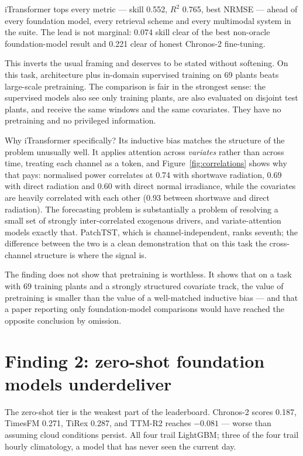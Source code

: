 iTransformer tops every metric --- skill 0.552, $R^2$ 0.765, best NRMSE --- ahead of every
foundation model, every retrieval scheme and every multimodal system in the suite. The lead
is not marginal: 0.074 skill clear of the best non-oracle foundation-model result and 0.221
clear of honest Chronos-2 fine-tuning.

This inverts the usual framing and deserves to be stated without softening. On this task,
architecture plus in-domain supervised training on 69 plants beats large-scale pretraining.
The comparison is fair in the strongest sense: the supervised models also see only training
plants, are also evaluated on disjoint test plants, and receive the same windows and the same
covariates. They have no pretraining and no privileged information.

Why iTransformer specifically? Its inductive bias matches the structure of the problem
unusually well. It applies attention across \emph{variates} rather than across time, treating
each channel as a token, and Figure~\ref{fig:correlations} shows why that pays: normalised
power correlates at 0.74 with shortwave radiation, 0.69 with direct radiation and 0.60 with
direct normal irradiance, while the covariates are heavily correlated with each other
(0.93 between shortwave and direct radiation). The forecasting problem is substantially a
problem of resolving a small set of strongly inter-correlated exogenous drivers, and
variate-attention models exactly that. PatchTST, which is channel-independent, ranks seventh;
the difference between the two is a clean demonstration that on this task the cross-channel
structure is where the signal is.

The finding does not show that pretraining is worthless. It shows that on a task with 69
training plants and a strongly structured covariate track, the value of pretraining is
smaller than the value of a well-matched inductive bias --- and that a paper reporting only
foundation-model comparisons would have reached the opposite conclusion by omission.

\section{Finding 2: zero-shot foundation models underdeliver}
\label{sec:finding2}

The zero-shot tier is the weakest part of the leaderboard. Chronos-2 scores 0.187, TimesFM
0.271, TiRex 0.287, and TTM-R2 reaches $-0.081$ --- worse than assuming cloud conditions
persist. All four trail LightGBM; three of the four trail hourly climatology, a model that
has never seen the current day.

